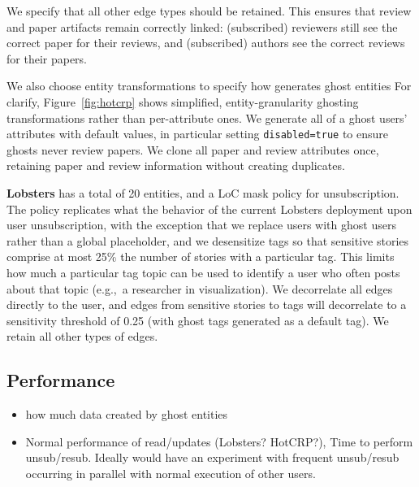 We specify that all other edge types should be retained. This ensures that
review and paper artifacts remain correctly linked: (subscribed) reviewers still see the correct
paper for their reviews, and (subscribed) authors see the correct reviews for their papers.
 

We also choose entity transformations to specify how \sys generates ghost entities 
For clarify, Figure~\ref{fig:hotcrp} shows simplified, entity-granularity ghosting
transformations rather than per-attribute ones.
We generate all of a ghost users' attributes with default values, in particular setting \texttt{disabled=true} to ensure ghosts never review papers. We clone all paper and review attributes once, retaining paper and review information without creating duplicates. 

\textbf{Lobsters} has a total of 20 entities, and a  LoC mask policy for unsubscription.
The policy replicates what the behavior of the current Lobsters deployment upon user unsubscription,
with the exception that we replace users with ghost users rather than a global placeholder, and we
desensitize tags so that sensitive stories comprise at most 25\% the number of stories with a
particular tag. This limits how much a particular tag topic can be used to identify a user who often
posts about that topic (e.g.,\ a researcher in visualization).  
We decorrelate all edges directly to the user, and edges from sensitive stories to tags will
decorrelate to a sensitivity threshold of 0.25 (with ghost tags generated as a default tag). 
We retain all other types of edges.

\subsection{\sys Performance}
\label{sec:perf}
\begin{itemize}
    \item how much data created by ghost entities
    \item Normal performance of read/updates (Lobsters? HotCRP?), Time to perform unsub/resub.
        Ideally would have an experiment with frequent unsub/resub occurring in parallel with normal execution
        of other users.
\end{itemize}

